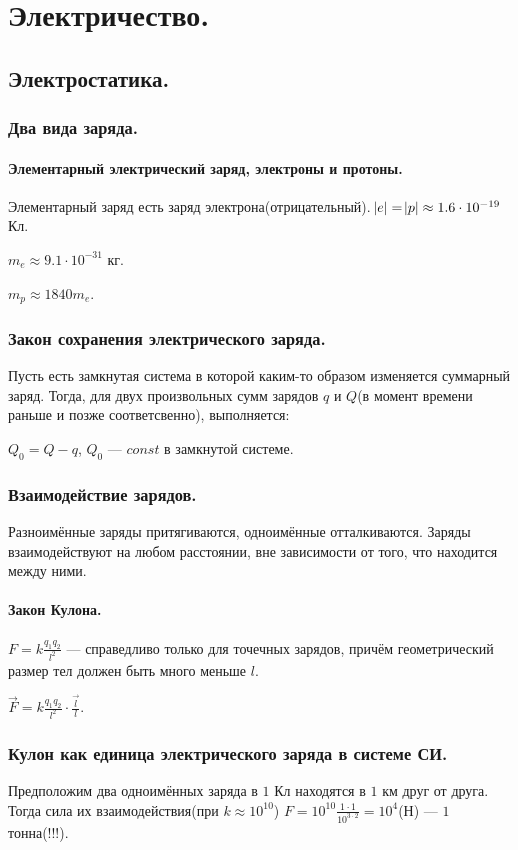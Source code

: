 \documentclass{article}
\begin{document}
\section{Электричество.}
    \subsection{Электростатика.}
        \subsubsection{Два вида заряда.}
            \paragraph{Элементарный электрический заряд, электроны и протоны.}
                Элементарный заряд есть заряд электрона(отрицательный). \(\abs{e} = \abs{p} \approx 1.6 \cdot 10^{-19} \) Кл.

                \(m_e \approx 9.1 \cdot 10^{-31}\) кг.
                
                \(m_p \approx 1840m_e\).

        \subsubsection{Закон сохранения электрического заряда.}
                Пусть есть замкнутая система в которой каким-то образом изменяется суммарный заряд. Тогда, для двух произвольных сумм зарядов \(q\) и \(Q\)(в момент времени раньше и позже соответсвенно), выполняется:

                \(Q_0 = Q - q\), \(Q_0\) --- \(const\) в замкнутой системе.
        \subsubsection{Взаимодействие зарядов.}
                Разноимённые заряды притягиваются, одноимённые отталкиваются. Заряды взаимодействуют на любом расстоянии, вне зависимости от того, что находится между ними.
            \paragraph{Закон Кулона.}
                \(F = k \frac{q_1 q_2}{l^2}\) --- справедливо только для точечных зарядов, причём геометрический размер тел должен быть много меньше \(l\).

                \(\vec{F} = k \frac{q_1 q_2}{l^2} \cdot \frac{\vec l}{l}\).
        \subsubsection{Кулон как единица электрического заряда в системе СИ.}
                Предположим два одноимённых заряда в \(1\) Кл находятся в \(1\) км друг от друга. Тогда сила их взаимодействия(при \(k \approx 10^{10}\)) \(F = 10^{10} \frac{1 \cdot 1}{10^{3 \cdot 2}} = 10^4\)(Н) --- \(1\) тонна(!!!).
\end{document}
